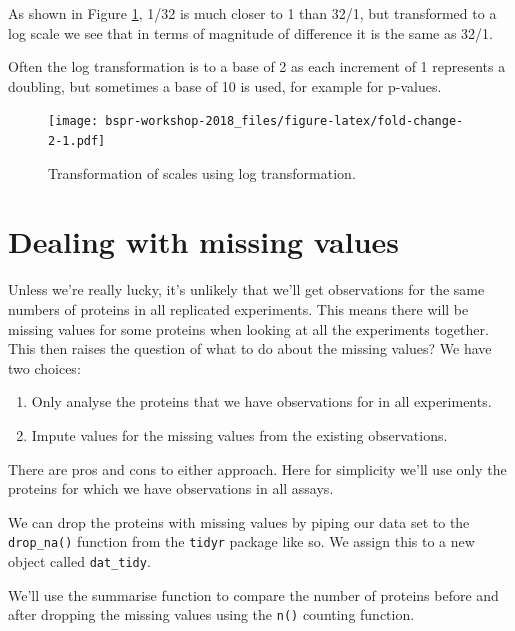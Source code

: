 \documentclass[12pt,]{book}
\newenvironment{Shaded}{\begin{snugshade}}{\end{snugshade}}
\newcommand{\CommentTok}[1]{\textcolor[rgb]{0.56,0.35,0.01}{\textit{#1}}}
\newcommand{\DataTypeTok}[1]{\textcolor[rgb]{0.13,0.29,0.53}{#1}}
\newcommand{\KeywordTok}[1]{\textcolor[rgb]{0.13,0.29,0.53}{\textbf{#1}}}
\newcommand{\NormalTok}[1]{#1}
\newcommand{\OperatorTok}[1]{\textcolor[rgb]{0.81,0.36,0.00}{\textbf{#1}}}
\newcommand{\StringTok}[1]{\textcolor[rgb]{0.31,0.60,0.02}{#1}}
\providecommand{\tightlist}{%
  \setlength{\itemsep}{0pt}\setlength{\parskip}{0pt}}
\begin{document}
As shown in Figure \ref{fig:fold-change-2}, 1/32 is much closer to 1 than 32/1,
but transformed to a log scale we see that in terms of magnitude of difference it
is the same as 32/1.

Often the log transformation is to a base of 2 as each increment of 1 represents
a doubling, but sometimes a base of 10 is used, for example for p-values.



\begin{figure}
\centering
\texttt{[image: bspr-workshop-2018\_files/figure-latex/fold-change-2-1.pdf]}
\caption{\label{fig:fold-change-2}Transformation of scales using log transformation.}
\end{figure}

\hypertarget{missing-values}{%
\section{Dealing with missing values}\label{missing-values}}

Unless we're really lucky, it's unlikely that we'll get observations for
the same numbers of proteins in all replicated experiments. This means
there will be missing values for some proteins when looking at all the
experiments together. This then raises the question of what to do about the
missing values? We have two choices:

\begin{enumerate}
\def\labelenumi{\arabic{enumi}.}
\tightlist
\item
  Only analyse the proteins that we have observations for in all experiments.
\item
  Impute values for the missing values from the existing observations.
\end{enumerate}

There are pros and cons to either approach. Here for simplicity we'll use only
the proteins for which we have observations in all assays.

We can drop the proteins with missing values by piping our data set to the
\texttt{drop\_na()} function from the \texttt{tidyr} package like so. We assign this to a new
object called \texttt{dat\_tidy}.

We'll use the summarise function to compare the number of proteins before and
after dropping the missing values using the \texttt{n()} counting function.

\begin{Shaded}
\end{Shaded}
\end{document}
